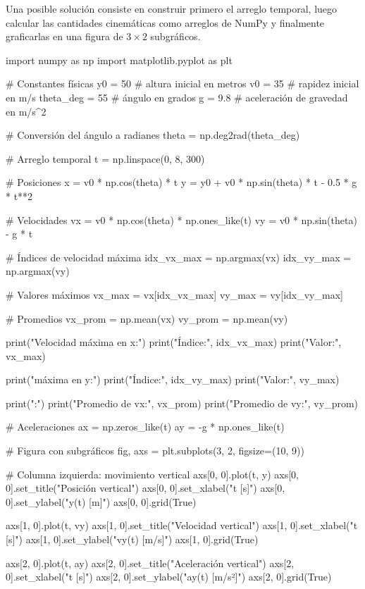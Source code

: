\begin{solution}
Una posible solución consiste en construir primero el arreglo temporal, luego calcular las cantidades cinemáticas como arreglos de NumPy y finalmente graficarlas en una figura de $3 \times 2$ subgráficos.

\begin{pythonjupyter}
import numpy as np
import matplotlib.pyplot as plt

# Constantes físicas
y0 = 50          # altura inicial en metros
v0 = 35          # rapidez inicial en m/s
theta_deg = 55   # ángulo en grados
g = 9.8          # aceleración de gravedad en m/s^2

# Conversión del ángulo a radianes
theta = np.deg2rad(theta_deg)

# Arreglo temporal
t = np.linspace(0, 8, 300)

# Posiciones
x = v0 * np.cos(theta) * t
y = y0 + v0 * np.sin(theta) * t - 0.5 * g * t**2

# Velocidades
vx = v0 * np.cos(theta) * np.ones_like(t)
vy = v0 * np.sin(theta) - g * t

# Índices de velocidad máxima
idx_vx_max = np.argmax(vx)
idx_vy_max = np.argmax(vy)

# Valores máximos
vx_max = vx[idx_vx_max]
vy_max = vy[idx_vy_max]

# Promedios
vx_prom = np.mean(vx)
vy_prom = np.mean(vy)

print("Velocidad máxima en x:")
print("Índice:", idx_vx_max)
print("Valor:", vx_max)

print("\nVelocidad máxima en y:")
print("Índice:", idx_vy_max)
print("Valor:", vy_max)

print("\nPromedios:")
print("Promedio de vx:", vx_prom)
print("Promedio de vy:", vy_prom)

# Aceleraciones
ax = np.zeros_like(t)
ay = -g * np.ones_like(t)

# Figura con subgráficos
fig, axs = plt.subplots(3, 2, figsize=(10, 9))

# Columna izquierda: movimiento vertical
axs[0, 0].plot(t, y)
axs[0, 0].set_title("Posición vertical")
axs[0, 0].set_xlabel("t [s]")
axs[0, 0].set_ylabel("y(t) [m]")
axs[0, 0].grid(True)

axs[1, 0].plot(t, vy)
axs[1, 0].set_title("Velocidad vertical")
axs[1, 0].set_xlabel("t [s]")
axs[1, 0].set_ylabel("vy(t) [m/s]")
axs[1, 0].grid(True)

axs[2, 0].plot(t, ay)
axs[2, 0].set_title("Aceleración vertical")
axs[2, 0].set_xlabel("t [s]")
axs[2, 0].set_ylabel("ay(t) [m/s²]")
axs[2, 0].grid(True)


\end{pythonjupyter}
\end{solution}
